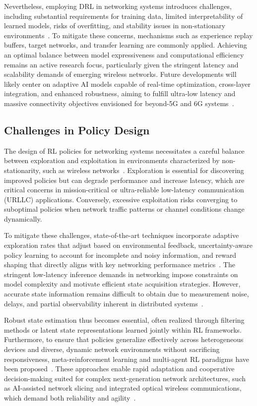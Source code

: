 \documentclass[sigconf]{acmart}
\begin{document}
Nevertheless, employing DRL in networking systems introduces challenges, including substantial requirements for training data, limited interpretability of learned models, risks of overfitting, and stability issues in non-stationary environments~\cite{ref13}. To mitigate these concerns, mechanisms such as experience replay buffers, target networks, and transfer learning are commonly applied. Achieving an optimal balance between model expressiveness and computational efficiency remains an active research focus, particularly given the stringent latency and scalability demands of emerging wireless networks. Future developments will likely center on adaptive AI models capable of real-time optimization, cross-layer integration, and enhanced robustness, aiming to fulfill ultra-low latency and massive connectivity objectives envisioned for beyond-5G and 6G systems~\cite{ref13,ref50}.

\subsection{Challenges in Policy Design}

The design of RL policies for networking systems necessitates a careful balance between exploration and exploitation in environments characterized by non-stationarity, such as wireless networks~\cite{ref3,ref6,ref14,ref48}. Exploration is essential for discovering improved policies but can degrade performance and increase latency, which are critical concerns in mission-critical or ultra-reliable low-latency communication (URLLC) applications. Conversely, excessive exploitation risks converging to suboptimal policies when network traffic patterns or channel conditions change dynamically.

To mitigate these challenges, state-of-the-art techniques incorporate adaptive exploration rates that adjust based on environmental feedback, uncertainty-aware policy learning to account for incomplete and noisy information, and reward shaping that directly aligns with key networking performance metrics~\cite{ref3,ref6}. The stringent low-latency inference demands in networking impose constraints on model complexity and motivate efficient state acquisition strategies. However, accurate state information remains difficult to obtain due to measurement noise, delays, and partial observability inherent in distributed systems~\cite{ref3,ref48}.

Robust state estimation thus becomes essential, often realized through filtering methods or latent state representations learned jointly within RL frameworks. Furthermore, to ensure that policies generalize effectively across heterogeneous devices and diverse, dynamic network environments without sacrificing responsiveness, meta-reinforcement learning and multi-agent RL paradigms have been proposed~\cite{ref14,ref6}. These approaches enable rapid adaptation and cooperative decision-making suited for complex next-generation network architectures, such as AI-assisted network slicing and integrated optical wireless communications, which demand both reliability and agility~\cite{ref6,ref14}.
\end{document}
